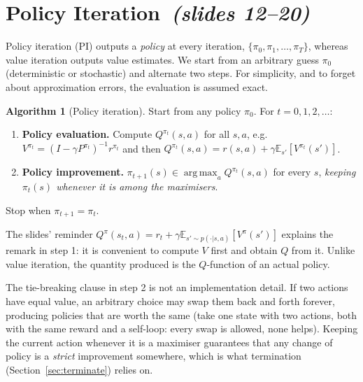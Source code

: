 \documentclass[11pt,a4paper]{article}
\newcommand{\E}{\mathbb{E}}
\DeclareMathOperator*{\argmax}{arg\,max}
\newcommand{\sltag}[1]{\texorpdfstring{\ \emph{(slides #1)}}{ (slides #1)}}
\theoremstyle{plain}
\theoremstyle{definition}
\newtheorem{algo}[theorem]{Algorithm}
\theoremstyle{remark}
\begin{document}
\section{Policy Iteration\sltag{12--20}}
Policy iteration (PI) outputs a \emph{policy} at every iteration, $\{\pi_0,\pi_1,\dots,\pi_T\}$, whereas value iteration outputs value estimates. We start from an arbitrary guess $\pi_0$ (deterministic or stochastic) and alternate two steps. For simplicity, and to forget about approximation errors, the evaluation is assumed exact.

\begin{algo}[Policy iteration]\label{alg:pi}
Start from any policy $\pi_0$. For $t=0,1,2,\dots$:
\begin{enumerate}[leftmargin=2.2em,itemsep=2pt]
\item \textbf{Policy evaluation.} Compute $Q^{\pi_t}(s,a)$ for all $s,a$, e.g. $V^{\pi_t}=(I-\gamma P^{\pi_t})^{-1}r^{\pi_t}$ and then $Q^{\pi_t}(s,a)=r(s,a)+\gamma\E_{s'}[V^{\pi_t}(s')]$.
\item \textbf{Policy improvement.} $\pi_{t+1}(s)\in\argmax_aQ^{\pi_t}(s,a)$ for every $s$, \emph{keeping $\pi_t(s)$ whenever it is among the maximisers}.
\end{enumerate}
Stop when $\pi_{t+1}=\pi_t$.
\end{algo}

The slides' reminder $Q^\pi(s_t,a)=r_t+\gamma\E_{s'\sim p(\cdot|s,a)}[V^\pi(s')]$ explains the remark in step 1: it is convenient to compute $V$ first and obtain $Q$ from it. Unlike value iteration, the quantity produced is the $Q$-function of an actual policy.

\begin{intuition}
The tie-breaking clause in step 2 is not an implementation detail. If two actions have equal value, an arbitrary choice may swap them back and forth forever, producing policies that are worth the same (take one state with two actions, both with the same reward and a self-loop: every swap is allowed, none helps). Keeping the current action whenever it is a maximiser guarantees that any change of policy is a \emph{strict} improvement somewhere, which is what termination (Section~\ref{sec:terminate}) relies on.
\end{intuition}
\end{document}
